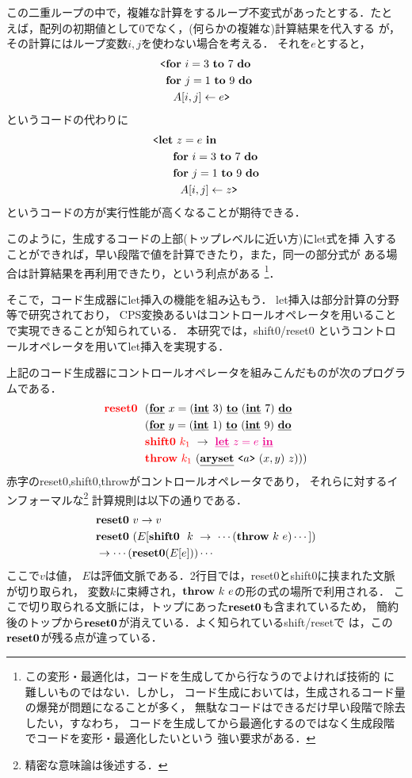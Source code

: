 この二重ループの中で，複雑な計算をするループ不変式があったとする．たと
えば，配列の初期値として$0$でなく，(何らかの複雑な)計算結果を代入する
が，その計算にはループ変数$i,j$を使わない場合を考える．
それを$e$とすると，
\begin{align*}
& \codebegin \forin{i=3}{7} \\
& \phantom{\codebegin} \forin{j=1}{9} \\
& \phantom{\codebegin} ~~\aryset{A}{i,j}{e} \codeend
\end{align*}
というコードの代わりに
\begin{align*}
& \codebegin \Let~z=e~\In \\
& \phantom{\codebegin \Let} \forin{i=3}{7} \\
& \phantom{\codebegin \Let} \forin{j=1}{9} \\
& \phantom{\codebegin \Let} ~~\aryset{A}{i,j}{z} \codeend
\end{align*}
というコードの方が実行性能が高くなることが期待できる．

このように，生成するコードの上部(トップレベルに近い方)にlet式を挿
入することができれば，早い段階で値を計算できたり，また，同一の部分式が
ある場合は計算結果を再利用できたり，という利点がある%
\footnote{この変形・最適化は，コードを生成してから行なうのでよければ技術的
に難しいものではない．しかし，
コード生成においては，生成されるコード量の爆発が問題になることが多く，
無駄なコードはできるだけ早い段階で除去したい，すなわち，
コードを生成してから最適化するのではなく生成段階でコードを変形・最適化したいという
強い要求がある．}．

そこで，コード生成器にlet挿入の機能を組み込もう．
let挿入は部分計算の分野等で研究されており，
CPS変換あるいはコントロールオペレータを用いることで実現できることが知られている．
本研究では，shift0/reset0 というコントロールオペレータを用いてlet挿入を実現する．

上記のコード生成器にコントロールオペレータを組みこんだものが次のプログラムである．
\begin{align*}
&\red{\Resetz} ~~(\cforin{x=(\cint~3)}{(\cint~7)} \\
&\phantom{\Resetz} ~~(\cforin{y=(\cint~1)}{(\cint~9)} \\
&\phantom{\Resetz} ~~\red{\Shiftz}~\red{k_1}~\to~ \magenta{\cLet~z=e~\cIn} \\
&\phantom{\Resetz} ~~\red{\Throw}~\red{k_1}~(\caryset{\code{a}}{(x,y)}{z})))
\end{align*}
赤字のreset0,shift0,throwがコントロールオペレータであり，
それらに対するインフォーマルな\footnote{精密な意味論は後述する．}%
計算規則は以下の通りである．
\begin{align*}
& \textbf{reset0} ~v \to v \\
& \textbf{reset0} ~(E[\textbf{shift0}~~k~\to~\cdots(\textbf{throw}~k~e)\cdots]) \\
& \to \cdots(\textbf{reset0}(E[e]))\cdots
\end{align*}
ここで$v$は値，
$E$は評価文脈である．2行目では，reset0とshift0に挟まれた文脈が切り取られ，
変数$k$に束縛され，$\textbf{throw}~k~e$の形の式の場所で利用される．
ここで切り取られる文脈には，トップにあった$\textbf{reset0}$も含まれているため，
簡約後のトップから$\textbf{reset0}$が消えている．よく知られているshift/resetで
は，この$\textbf{reset0}$が残る点が違っている．

